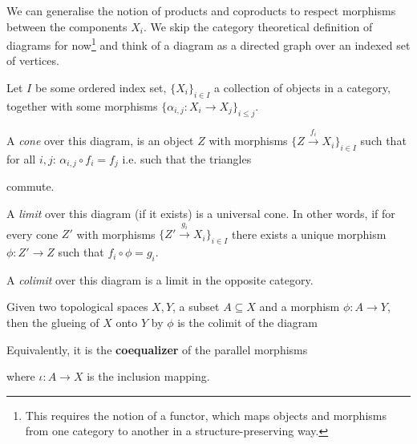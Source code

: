We can generalise the notion of products and coproducts to respect morphisms between the components $X_i$.
We skip the category theoretical definition of diagrams for now\footnote{This requires the notion of a functor, which maps objects and morphisms from one category to another in a structure-preserving way.} and think of a diagram as a directed graph over an indexed set of vertices.

\begin{dfn}[]
Let $I$ be some ordered index set, $\{X_i\}_{i \in I}$ a collection of objects in a category, together with some morphisms $\{\alpha_{i,j}:X_i \to X_j\}_{i \leq j}$.

A \emph{cone} over this diagram, is an object $Z$ with morphisms $\{Z \stackrel{f_i}{\to} X_i\}_{i \in I}$ such that for all $i,j$: $\alpha_{i,j} \circ f_i = f_j$ i.e. such that the triangles
\begin{center}
\end{center}
commute.

A \emph{limit} over this diagram (if it exists) is a universal cone.
In other words, if for every cone $Z'$ with morphisms $\{Z' \stackrel{g_i}{\to} X_i\}_{i \in I}$ there exists a unique morphism $\phi: Z' \to Z$ such that $f_i \circ \phi = g_i$.
\begin{center}
\end{center}
A \emph{colimit} over this diagram is a limit in the opposite category.
\end{dfn}

\begin{ex}[Glueing]
  Given two topological spaces $X,Y$, a subset $A \subseteq X$ and a morphism $\phi: A \to Y$, then the glueing of $X$ onto $Y$ by $\phi$ is the colimit of the diagram
  \begin{center}
  \end{center}
Equivalently, it is the \textbf{coequalizer} of the parallel morphisms
\begin{center}
\end{center}
where $\iota:A \to X$ is the inclusion mapping.
\end{ex}

